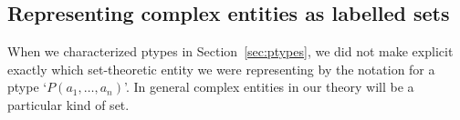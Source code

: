 



\subsection{Representing complex entities as labelled sets}
\label{sec:labelled-sets}
When we characterized ptypes in Section~\ref{sec:ptypes}, we did not
make explicit exactly which set-theoretic entity we were representing
by the notation for a ptype `$P(a_1,\ldots,a_n)$'.  In general complex
entities in our theory will be a particular kind of set.

